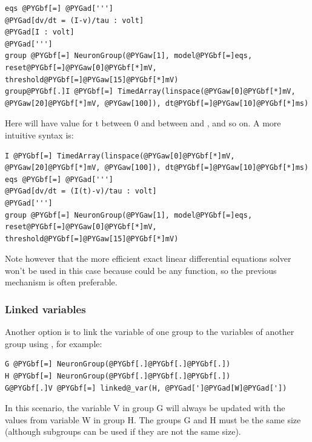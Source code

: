 \documentclass[letterpaper,10pt,english]{manual}
\begin{document}
\begin{Verbatim}[commandchars=@\[\]]
eqs @PYGbf[=] @PYGad[''']
@PYGad[dv/dt = (I-v)/tau : volt]
@PYGad[I : volt]
@PYGad[''']
group @PYGbf[=] NeuronGroup(@PYGaw[1], model@PYGbf[=]eqs, reset@PYGbf[=]@PYGaw[0]@PYGbf[*]mV, threshold@PYGbf[=]@PYGaw[15]@PYGbf[*]mV)
group@PYGbf[.]I @PYGbf[=] TimedArray(linspace(@PYGaw[0]@PYGbf[*]mV, @PYGaw[20]@PYGbf[*]mV, @PYGaw[100]), dt@PYGbf[=]@PYGaw[10]@PYGbf[*]ms)
\end{Verbatim}

Here  will have value  for t between 0 and  between  and
, and so on. A more intuitive syntax is:

\begin{Verbatim}[commandchars=@\[\]]
I @PYGbf[=] TimedArray(linspace(@PYGaw[0]@PYGbf[*]mV, @PYGaw[20]@PYGbf[*]mV, @PYGaw[100]), dt@PYGbf[=]@PYGaw[10]@PYGbf[*]ms)
eqs @PYGbf[=] @PYGad[''']
@PYGad[dv/dt = (I(t)-v)/tau : volt]
@PYGad[''']
group @PYGbf[=] NeuronGroup(@PYGaw[1], model@PYGbf[=]eqs, reset@PYGbf[=]@PYGaw[0]@PYGbf[*]mV, threshold@PYGbf[=]@PYGaw[15]@PYGbf[*]mV)
\end{Verbatim}

Note however that the more efficient exact linear differential equations solver won't be used in this
case because  could be any function, so the previous mechanism is often preferable.


\subsubsection{Linked variables}

Another option is to link the variable of one group to the variables of another group using
\hyperlink{brian.linked_var}{}, for example:

\begin{Verbatim}[commandchars=@\[\]]
G @PYGbf[=] NeuronGroup(@PYGbf[.]@PYGbf[.]@PYGbf[.])
H @PYGbf[=] NeuronGroup(@PYGbf[.]@PYGbf[.]@PYGbf[.])
G@PYGbf[.]V @PYGbf[=] linked@_var(H, @PYGad[']@PYGad[W]@PYGad['])
\end{Verbatim}

In this scenario, the variable V in group G will always be updated with
the values from variable W in group H. The groups G and H must be the
same size (although subgroups can be used if they are not the same size).

\resetcurrentobjects
\hypertarget{--doc-operations}{}
\end{document}
